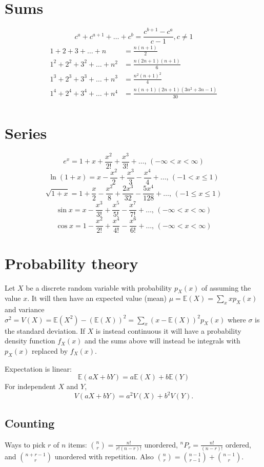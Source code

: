 \section{Sums}
\[ c^a + c^{a+1} + \dots + c^{b} = \frac{c^{b+1} - c^a}{c-1}, c \neq 1 \]
\begin{align*}
	1 + 2 + 3 + \dots + n &= \frac{n(n+1)}{2} \\
	1^2 + 2^2 + 3^2 + \dots + n^2 &= \frac{n(2n+1)(n+1)}{6} \\
	1^3 + 2^3 + 3^3 + \dots + n^3 &= \frac{n^2(n+1)^2}{4} \\
	1^4 + 2^4 + 3^4 + \dots + n^4 &= \frac{n(n+1)(2n+1)(3n^2 + 3n - 1)}{30} \\
\end{align*}

\section{Series}
$$e^x = 1+x+\frac{x^2}{2!}+\frac{x^3}{3!}+\dots,\,(-\infty<x<\infty)$$
$$\ln(1+x) = x-\frac{x^2}{2}+\frac{x^3}{3}-\frac{x^4}{4}+\dots,\,(-1<x\leq1)$$
$$\sqrt{1+x} = 1+\frac{x}{2}-\frac{x^2}{8}+\frac{2x^3}{32}-\frac{5x^4}{128}+\dots,\,(-1\leq x\leq1)$$
$$\sin x = x-\frac{x^3}{3!}+\frac{x^5}{5!}-\frac{x^7}{7!}+\dots,\,(-\infty<x<\infty)$$
$$\cos x = 1-\frac{x^2}{2!}+\frac{x^4}{4!}-\frac{x^6}{6!}+\dots,\,(-\infty<x<\infty)$$

\section{Probability theory}
Let $X$ be a discrete random variable with probability $p_X(x)$ of assuming the value $x$. It will then have an expected value (mean) $\mu=\mathbb{E}(X)=\sum_xxp_X(x)$ and variance $\sigma^2=V(X)=\mathbb{E}(X^2)-(\mathbb{E}(X))^2=\sum_x(x-\mathbb{E}(X))^2p_X(x)$ where $\sigma$ is the standard deviation. If $X$ is instead continuous it will have a probability density function $f_X(x)$ and the sums above will instead be integrals with $p_X(x)$ replaced by $f_X(x)$.

Expectation is linear:
\[\mathbb{E}(aX+bY) = a\mathbb{E}(X)+b\mathbb{E}(Y)\]
For independent $X$ and $Y$, \[V(aX+bY) = a^2V(X)+b^2V(Y).\]

\subsection{Counting}
Ways to pick $r$ of $n$ items: $\binom{n}{r} = \frac{n!}{r!(n-r)!}$ unordered,
${}^nP_r = \frac{n!}{(n-r)!}$ ordered, and $\binom{n+r-1}{r}$ unordered with repetition.
Also $\binom{n}{r} = \binom{n-1}{r-1} + \binom{n-1}{r}$.

